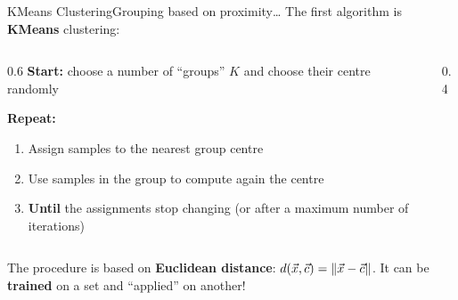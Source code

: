 \begin{frame}{KMeans Clustering}{Grouping based on proximity\dots}
    The first algorithm is \textbf{KMeans} clustering:

    \vfill

    \begin{columns}[c]
        \begin{column}{0.6\textwidth}
            \alert<2>{\textbf{Start:} choose a number of \enquote{groups} $K$ and choose their centre randomly}

            \textbf{Repeat:}
            \begin{enumerate}
                \item \alert<3>{Assign samples to the nearest group centre}
                \item \alert<4>{Use samples in the group to compute again the centre}
                \item \textbf{Until} the assignments stop changing (or after a maximum number of iterations)
            \end{enumerate}
        \end{column}
        \hfil
        \begin{column}{0.4\textwidth}
            \centering
            
        \end{column}
    \end{columns}

    \vfill

    The procedure is based on \textbf{Euclidean distance}: $d(\vec{x}, \vec{c}) = \norm{\vec{x} - \vec{c}}$.
    It can be \textbf{trained} on a set and \enquote{applied} on another!
\end{frame}

